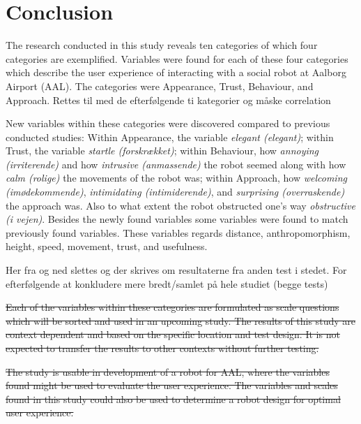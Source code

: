 \section{Conclusion}
\label{Conclusion}
%
The research conducted in this study reveals ten categories of which four categories are exemplified. Variables were found for each of these four categories which describe the user experience of interacting with a social robot at Aalborg Airport (AAL). The categories were Appearance, Trust, Behaviour, and Approach. {\color{red} Rettes til med de efterfølgende ti kategorier og måske correlation}

New variables within these categories were discovered compared to previous conducted studies: Within Appearance, the variable \textit{elegant (elegant)}; within Trust, the variable \textit{startle (forskrækket)}; within Behaviour, how \textit{annoying (irriterende)} and how \textit{intrusive (anmassende)} the robot seemed along with how \textit{calm (rolige)} the movements of the robot was; within Approach, how \textit{welcoming (imødekommende)}, \textit{intimidating (intimiderende)}, and \textit{surprising (overraskende)} the approach was. Also to what extent the robot obstructed one's way \textit{obstructive (i vejen)}. Besides the newly found variables some variables were found to match previously found variables. These variables regards distance, anthropomorphism, height, speed, movement, trust, and usefulness.

{\color{red} Her fra og ned slettes og der skrives om resultaterne fra anden test i stedet. For efterfølgende at konkludere mere bredt/samlet på hele studiet (begge tests)}

\sout{Each of the variables within these categories are formulated as scale questions which will be sorted and used in an upcoming study. The results of this study are context dependent and based on the specific location and test design. It is not expected to transfer the results to other contexts without further testing. }

\sout{The study is usable in development of a robot for AAL, where the variables found might be used to evaluate the user experience. The variables and scales found in this study could also be used to determine a robot design for optimal user experience.}

